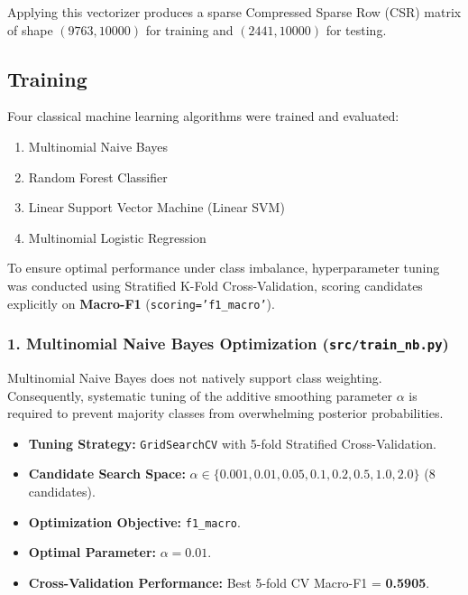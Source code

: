 Applying this vectorizer produces a sparse Compressed Sparse Row (CSR) matrix of shape $(9763, 10000)$ for training and $(2441, 10000)$ for testing.

\subsection{Training}
\label{subsec:training}
Four classical machine learning algorithms were trained and evaluated:
\begin{enumerate}
    \item Multinomial Naive Bayes
    \item Random Forest Classifier
    \item Linear Support Vector Machine (Linear SVM)
    \item Multinomial Logistic Regression
\end{enumerate}

To ensure optimal performance under class imbalance, hyperparameter tuning was conducted using Stratified K-Fold Cross-Validation, scoring candidates explicitly on \textbf{Macro-F1} (\texttt{scoring='f1\_macro'}).

\subsubsection*{1. Multinomial Naive Bayes Optimization (\texttt{src/train\_nb.py})}
Multinomial Naive Bayes does not natively support class weighting. Consequently, systematic tuning of the additive smoothing parameter $\alpha$ is required to prevent majority classes from overwhelming posterior probabilities.
\begin{itemize}
    \item \textbf{Tuning Strategy:} \texttt{GridSearchCV} with 5-fold Stratified Cross-Validation.
    \item \textbf{Candidate Search Space:} $\alpha \in \{0.001, 0.01, 0.05, 0.1, 0.2, 0.5, 1.0, 2.0\}$ (8 candidates).
    \item \textbf{Optimization Objective:} \texttt{f1\_macro}.
    \item \textbf{Optimal Parameter:} $\alpha = \mathbf{0.01}$.
    \item \textbf{Cross-Validation Performance:} Best 5-fold CV Macro-F1 = \textbf{0.5905}.
\end{itemize}

